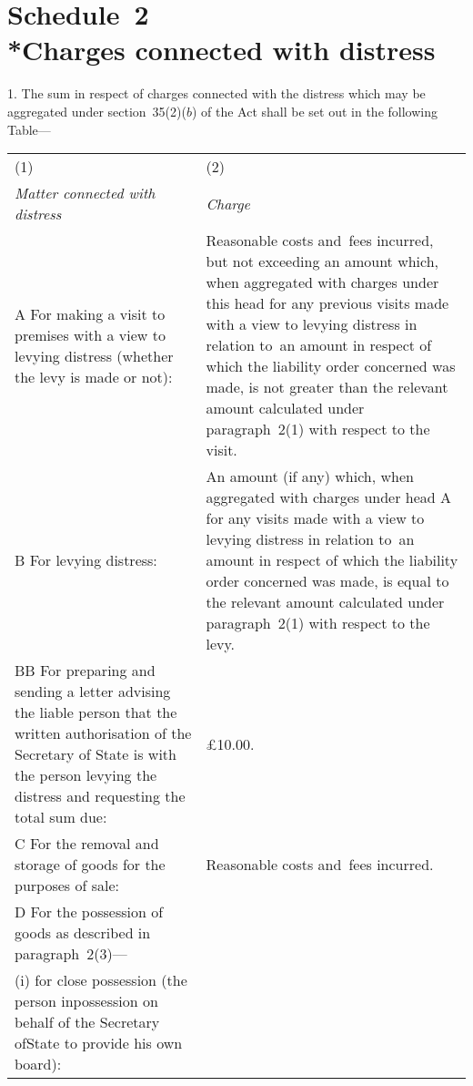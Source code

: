 \documentclass[12pt,a4paper]{article}
\begin{document}
\part[Schedule~2 --- Charges connected with distress]{Schedule~2\\*Charges connected with distress}

\renewcommand\parthead{--- Schedule~2}

1.  The sum in respect of charges connected with the distress which may be aggregated under section~35(2)($b$) of the Act shall be set out in the following Table—

{\noindent\footnotesize
\begin{longtable}{p{183pt}p{183pt}}
\hline
(1)&(2)\\
\itshape Matter connected with distress&\itshape Charge\\
\hline
\endhead
\hline
\endlastfoot
A {} For making a visit to premises with a view to levying distress (whether the levy is made or not):&
Reasonable costs and~fees incurred, but not exceeding an amount which, when aggregated with charges under this head for any previous visits made with a view to levying distress in relation to~an amount in respect of which the liability order concerned was made, is not greater than the relevant amount calculated under paragraph~2(1) with respect to the visit.\\
B {} For levying distress:&
An amount (if any) which, when aggregated with charges under head A for any visits made with a view to levying distress in relation to~an amount in respect of which the liability order concerned was made, is equal to the relevant amount calculated under paragraph~2(1) with respect to the levy.\\
BB {} For preparing and sending a letter advising the liable person that the written authorisation of the Secretary of State is with the person levying the distress and requesting the total sum due: & £10$.$00.\\
C {} For the removal and storage of goods for the purposes of sale:&
Reasonable costs and~fees incurred.\\
D {}  For the possession of goods as described in paragraph~2(3)—\\
\hspace{12pt}(i) for close possession (the person in\linebreak\hspace*{12pt}possession on behalf of the Secretary of\linebreak\hspace*{12pt}State to provide his own board):&

\end{longtable}}
\end{document}
